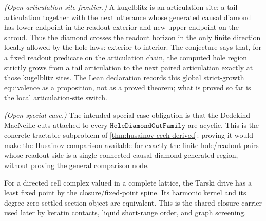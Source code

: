 \begin{theorem}\label{thm:kugelblitz-growth-conjecture}\notready{}
\emph{(Open articulation-site frontier.)}  A kugelblitz is an articulation site: a
tail articulation together with the next utterance whose generated causal diamond has lower
endpoint in the readout exterior and new upper endpoint on the shroud.  Thus the diamond
crosses the readout horizon in the only finite direction locally allowed by the hole laws:
exterior to interior.  The conjecture says that, for a fixed readout predicate on the
articulation chain, the computed hole region strictly grows from a tail articulation to the
next paired articulation exactly at those kugelblitz sites.  The Lean declaration records
this global strict-growth equivalence as a proposition, not as a proved theorem; what is
proved so far is the local articulation-site switch.
\end{theorem}

\begin{theorem}\label{thm:hole-diamond-cut-acyclicity}\notready{}
\emph{(Open special case.)} The intended special-case obligation is that the
Dedekind--MacNeille cuts attached to every $\texttt{HoleDiamondCutFamily}$ are acyclic. This is
the concrete tractable subproblem of \cref{thm:husainov-cech-derived}: proving it would make the
Husainov comparison available for exactly the finite hole/readout pairs whose readout side is a
single connected causal-diamond-generated region, without proving the general comparison node.
\end{theorem}

\begin{theorem}\label{thm:tarski-sheaf-closure}\leanok{}
For a directed cell complex valued in a complete lattice, the Tarski drive has a
least fixed point by the closure/fixed-point spine. Its harmonic kernel and its
degree-zero settled-section object are equivalent. This is the shared closure
carrier used later by keratin contacts, liquid short-range order, and graph
screening.
\end{theorem}
